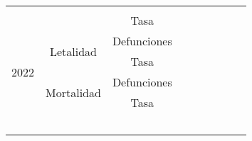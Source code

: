 \begin{tabular}{cccllllll}
			\multicolumn{1}{c|}{} &
			\multicolumn{1}{c|}{} &
			\multicolumn{1}{c|}{} &
			\multicolumn{1}{c|}{} &
			\multicolumn{1}{l|}{} &
			\multicolumn{1}{l|}{} \\ \cline{3-9} 
			\multicolumn{1}{|c|}{} &
			\multicolumn{1}{c|}{} &
			\multicolumn{1}{c|}{Tasa} &
			\multicolumn{1}{l|}{} &
			\multicolumn{1}{l|}{} &
			\multicolumn{1}{l|}{} &
			\multicolumn{1}{l|}{} &
			\multicolumn{1}{l|}{} &
			\multicolumn{1}{l|}{} \\ \hline
			\multicolumn{1}{|c|}{\multirow{4}{*}{2022}} &
			\multicolumn{1}{c|}{\multirow{2}{*}{Letalidad}} &
			\multicolumn{1}{c|}{Defunciones} &
			\multicolumn{1}{l|}{} &
			\multicolumn{1}{l|}{} &
			\multicolumn{1}{l|}{} &
			\multicolumn{1}{l|}{} &
			\multicolumn{1}{l|}{} &
			\multicolumn{1}{l|}{} \\ \cline{3-9} 
			\multicolumn{1}{|c|}{} &
			\multicolumn{1}{c|}{} &
			\multicolumn{1}{c|}{Tasa} &
			\multicolumn{1}{l|}{} &
			\multicolumn{1}{l|}{} &
			\multicolumn{1}{l|}{} &
			\multicolumn{1}{l|}{} &
			\multicolumn{1}{l|}{} &
			\multicolumn{1}{l|}{} \\ \cline{2-9} 
			\multicolumn{1}{|c|}{} &
			\multicolumn{1}{c|}{\multirow{2}{*}{Mortalidad}} &
			\multicolumn{1}{c|}{Defunciones} &
			\multicolumn{1}{l|}{} &
			\multicolumn{1}{l|}{} &
			\multicolumn{1}{l|}{} &
			\multicolumn{1}{l|}{} &
			\multicolumn{1}{l|}{} &
			\multicolumn{1}{l|}{} \\ \cline{3-9} 
			\multicolumn{1}{|c|}{} &
			\multicolumn{1}{c|}{} &
			\multicolumn{1}{c|}{Tasa} &
			\multicolumn{1}{l|}{} &
			\multicolumn{1}{l|}{} &
			\multicolumn{1}{l|}{} &
			\multicolumn{1}{l|}{} &
			\multicolumn{1}{l|}{} &
			\multicolumn{1}{l|}{} \\ \hline
			\multicolumn{1}{l}{} &
			\multicolumn{1}{l}{} &
			\multicolumn{1}{l}{} &
			&
			&
			&
			&
			&
			\\
			\multicolumn{1}{l}{} &
			\multicolumn{1}{l}{} &
			\multicolumn{1}{l}{} &
			&
			&
			&
			&
			&
			\\
			\multicolumn{1}{l}{} &
			\multicolumn{1}{l}{} &
			\multicolumn{1}{l}{} &
			&
			&
			&
			&
			&
			\\
			\multicolumn{1}{l}{} &
			\multicolumn{1}{l}{} &
			\multicolumn{1}{l}{} &
			&
			&
			&
			&
			&
			\\
			\multicolumn{1}{l}{} &
			\multicolumn{1}{l}{} &
			\multicolumn{1}{l}{} &
			&
			&
			&
			&
			&
			
		\end{tabular}

